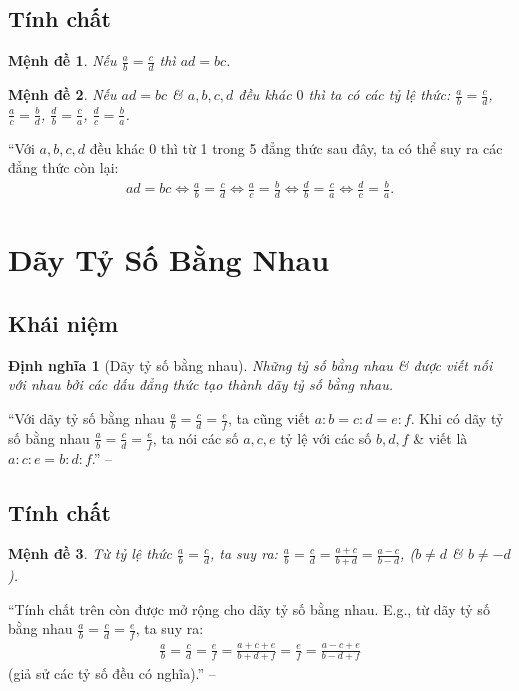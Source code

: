 \documentclass[oneside]{book}
\numberwithin{equation}{section}
\newtheorem{dinhnghia}{Định nghĩa}[section]
\newtheorem{menhde}{Mệnh đề}[section]
\begin{document}
\subsection{Tính chất}

\begin{menhde}
	Nếu $\frac{a}{b} = \frac{c}{d}$ thì $ad = bc$.
\end{menhde}

\begin{menhde}
	Nếu $ad = bc$ \& $a,b,c,d$ đều khác $0$ thì ta có các tỷ lệ thức: $\frac{a}{b} = \frac{c}{d}$, $\frac{a}{c} = \frac{b}{d}$, $\frac{d}{b} = \frac{c}{a}$, $\frac{d}{c} = \frac{b}{a}$.
\end{menhde}
``Với $a,b,c,d$ đều khác $0$ thì từ 1 trong 5 đẳng thức sau đây, ta có thể suy ra các đẳng thức còn lại:
\begin{align*}
	ad = bc\Leftrightarrow\frac{a}{b} = \frac{c}{d}\Leftrightarrow\frac{a}{c} = \frac{b}{d}\Leftrightarrow\frac{d}{b} = \frac{c}{a}\Leftrightarrow\frac{d}{c} = \frac{b}{a}.
\end{align*}

\section{Dãy Tỷ Số Bằng Nhau}

\subsection{Khái niệm}

\begin{dinhnghia}[Dãy tỷ số bằng nhau]
	Những tỷ số bằng nhau \& được viết nối với nhau bởi các dấu đẳng thức tạo thành \emph{dãy tỷ số bằng nhau}.
\end{dinhnghia}
``Với dãy tỷ số bằng nhau $\frac{a}{b} = \frac{c}{d} = \frac{e}{f}$, ta cũng viết $a:b = c:d = e:f$. Khi có dãy tỷ số bằng nhau $\frac{a}{b} = \frac{c}{d} = \frac{e}{f}$, ta nói các số $a,c,e$ tỷ lệ với các số $b,d,f$ \& viết là $a:c:e = b:d:f$.'' -- \cite[p. 55]{SGK_Toan_7_Canh_Dieu_tap_1}

\subsection{Tính chất}

\begin{menhde}
	Từ tỷ lệ thức $\frac{a}{b} = \frac{c}{d}$, ta suy ra: $\frac{a}{b} = \frac{c}{d} = \frac{a + c}{b + d} = \frac{a - c}{b - d}$, ($b\ne d$ \& $b\ne -d$).
\end{menhde}
``Tính chất trên còn được mở rộng cho dãy tỷ số bằng nhau. E.g., từ dãy tỷ số bằng nhau $\frac{a}{b} = \frac{c}{d} = \frac{e}{f}$, ta suy ra:
\begin{align*}
	\frac{a}{b} = \frac{c}{d} = \frac{e}{f} = \frac{a + c + e}{b + d + f} = \frac{e}{f} = \frac{a - c + e}{b - d + f}
\end{align*}
(giả sử các tỷ số đều có nghĩa).'' -- \cite[p. 56]{SGK_Toan_7_Canh_Dieu_tap_1}
\end{document}
